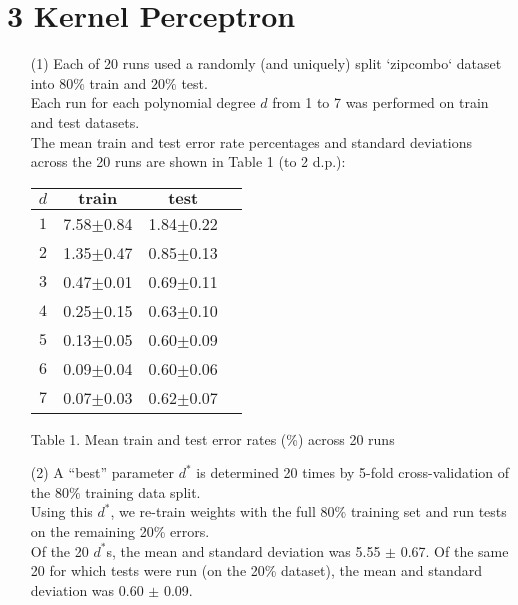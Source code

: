 \documentclass[a4paper,12pt]{article}
\begin{document}
\section*{3 Kernel Perceptron}
\begin{enumerate}

\item[(1)] 
Each of 20 runs used a randomly (and uniquely) split `zipcombo` dataset into $80\%$ train and $20\%$ test. \\
Each run for each polynomial degree $d$ from 1 to 7 was performed on train and test datasets.\\
The mean train and test error rate percentages and standard deviations across the 20 runs are shown in Table 1 (to 2 d.p.):

\begin{tabular}{|c|c|c|c|}
\hline
$d$&$\textbf{train}$&$\textbf{test}$\\
\hline
$1$&7.58$\pm$0.84&1.84$\pm$0.22\\
\hline
$2$&1.35$\pm$0.47&0.85$\pm$0.13\\
\hline
$3$&0.47$\pm$0.01&0.69$\pm$0.11\\
\hline
$4$&0.25$\pm$0.15&0.63$\pm$0.10\\
\hline
$5$&0.13$\pm$0.05&0.60$\pm$0.09\\
\hline
$6$&0.09$\pm$0.04&0.60$\pm$0.06\\
\hline
$7$&0.07$\pm$0.03&0.62$\pm$0.07\\
\hline
\end{tabular}\par 
Table 1. Mean train and test error rates (\%) across 20 runs

\item[(2)] 
A “best” parameter $d^*$ is determined 20 times by 5-fold cross-validation of the $80\%$ training data split. \\
Using this $d^*$, we re-train weights with the full $80\%$ training set and run tests on the remaining 20\% errors. \\
Of the 20 $d^*$s, the mean and standard deviation was 5.55 $\pm$ 0.67.
Of the same 20 for which tests were run (on the 20\% dataset), the mean and standard deviation was 0.60 $\pm$ 0.09.

\end{enumerate}
\clearpage
\end{document}
